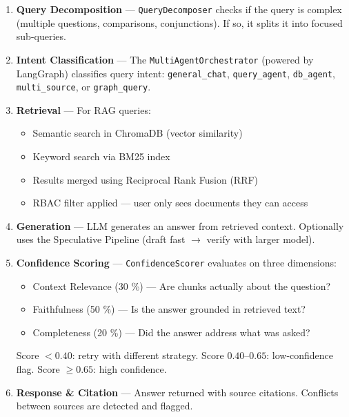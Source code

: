 \documentclass[12pt, a4paper, oneside]{report}
\newcommand{\kw}[1]{\texttt{\small #1}}
\begin{document}
\begin{enumerate}
  \item \textbf{Query Decomposition} — \kw{QueryDecomposer} checks if the query is complex
        (multiple questions, comparisons, conjunctions). If so, it splits it into focused
        sub-queries.

  \item \textbf{Intent Classification} — The \kw{MultiAgentOrchestrator} (powered by
        LangGraph) classifies query intent: \kw{general\_chat}, \kw{query\_agent},
        \kw{db\_agent}, \kw{multi\_source}, or \kw{graph\_query}.

  \item \textbf{Retrieval} — For RAG queries:
        \begin{itemize}
          \item Semantic search in ChromaDB (vector similarity)
          \item Keyword search via BM25 index
          \item Results merged using Reciprocal Rank Fusion (RRF)
          \item RBAC filter applied — user only sees documents they can access
        \end{itemize}

  \item \textbf{Generation} — LLM generates an answer from retrieved context. Optionally uses
        the Speculative Pipeline (draft fast \(\rightarrow\) verify with larger model).

  \item \textbf{Confidence Scoring} — \kw{ConfidenceScorer} evaluates on three dimensions:
        \begin{itemize}
          \item Context Relevance (30 \%) — Are chunks actually about the question?
          \item Faithfulness (50 \%) — Is the answer grounded in retrieved text?
          \item Completeness (20 \%) — Did the answer address what was asked?
        \end{itemize}
        Score $< 0.40$: retry with different strategy. Score $0.40$--$0.65$: low-confidence
        flag. Score $\geq 0.65$: high confidence.

  \item \textbf{Response \& Citation} — Answer returned with source citations. Conflicts
        between sources are detected and flagged.
\end{enumerate}
\end{document}

